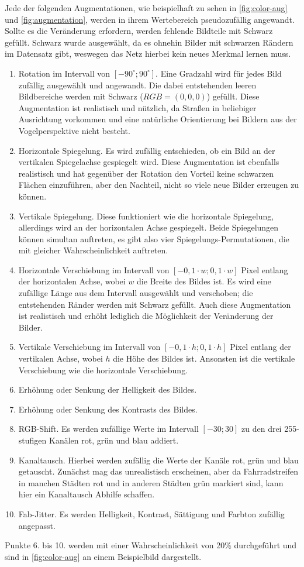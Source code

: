 Jede der folgenden Augmentationen, wie beispielhaft zu sehen in \autoref{fig:color-aug} und \autoref{fig:augmentation}, 
werden in ihrem Wertebereich pseudozufällig angewandt. 
Sollte es die Veränderung erfordern, werden fehlende Bildteile mit Schwarz gefüllt. Schwarz wurde ausgewählt, da es ohnehin Bilder mit 
schwarzen Rändern im Datensatz gibt, weswegen das Netz hierbei kein neues Merkmal lernen muss. 
\begin{enumerate}
	\item Rotation im Intervall von $[-90^\circ ; 90^\circ ]$. Eine Gradzahl wird für jedes Bild zufällig ausgewählt und angewandt. 
	Die dabei entstehenden leeren Bildbereiche werden mit Schwarz ($RGB = (0,0,0)$) gefüllt. 
	Diese Augmentation ist realistisch und nützlich, da Straßen in beliebiger Ausrichtung vorkommen und 
	eine natürliche Orientierung bei Bildern aus der Vogelperspektive nicht besteht.
	\item Horizontale Spiegelung. Es wird zufällig entschieden, ob ein Bild an der vertikalen Spiegelachse gespiegelt wird. 
	Diese Augmentation ist ebenfalls realistisch und hat gegenüber der Rotation den Vorteil keine schwarzen Flächen 
	einzuführen, aber den Nachteil, nicht so viele neue Bilder erzeugen zu können. 
	\item Vertikale Spiegelung. Diese funktioniert wie die horizontale Spiegelung, allerdings wird an der horizontalen Achse gespiegelt. 
	Beide Spiegelungen können simultan auftreten, es gibt also vier Spiegelungs-Permutationen, 
	die mit gleicher Wahrscheinlichkeit auftreten.
	\item Horizontale Verschiebung im Intervall von $[-0,1 \cdot w; 0,1 \cdot w]$ Pixel entlang der horizontalen Achse,
	wobei $w$ die Breite des Bildes ist. Es wird eine zufällige Länge aus dem Intervall ausgewählt und verschoben; die 
	entstehenden Ränder werden mit Schwarz gefüllt. Auch diese Augmentation ist realistisch und erhöht lediglich 
	die Möglichkeit der Veränderung der Bilder. 
	\item Vertikale Verschiebung im Intervall von $[-0,1 \cdot h; 0,1 \cdot h]$ Pixel entlang der vertikalen Achse,
	wobei $h$ die Höhe des Bildes ist. Ansonsten ist die vertikale Verschiebung wie die horizontale Verschiebung.  
	\item Erhöhung oder Senkung der Helligkeit des Bildes.
	\item Erhöhung oder Senkung des Kontrasts des Bildes.
	\item RGB-Shift. Es werden zufällige Werte im Intervall $[-30; 30]$ zu den drei 255-stufigen Kanälen rot, grün und blau addiert.   
	\item Kanaltausch. Hierbei werden zufällig die Werte der Kanäle rot, grün und blau getauscht.
	Zunächst mag das unrealistisch erscheinen, aber da Fahrradstreifen in manchen Städten 
	rot und in anderen Städten grün markiert sind, kann hier ein Kanaltausch Abhilfe schaffen. 
	\item Fab-Jitter. Es werden Helligkeit, Kontrast, Sättigung und Farbton zufällig angepasst. 
\end{enumerate} 
Punkte 6. bis 10. werden mit einer Wahrscheinlichkeit von 20\% durchgeführt und sind in \autoref{fig:color-aug} an einem Beispielbild dargestellt. 

